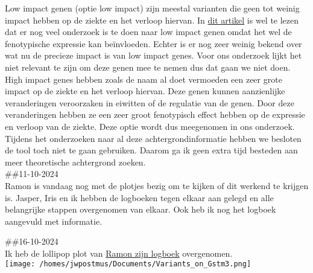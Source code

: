 \documentclass[
]{article}
\begin{document}
Low impact genen (optie low impact) zijn meestal varianten die geen tot
weinig impact hebben op de ziekte en het verloop hiervan. In
\href{https://genomebiology.biomedcentral.com/articles/10.1186/s13059-017-1212-4\#Sec1}{dit
artikel} is wel te lezen dat er nog veel onderzoek is te doen naar low
impact genen omdat het wel de fenotypische expressie kan beïnvloeden.
Echter is er nog zeer weinig bekend over wat nu de precieze impact is
van low impact genes. Voor ons onderzoek lijkt het niet relevant te zijn
om deze genen mee te nemen dus dat gaan we niet doen.\\

High impact genes hebben zoals de naam al doet vermoeden een zeer grote
impact op de ziekte en het verloop hiervan. Deze genen kunnen
aanzienlijke veranderingen veroorzaken in eiwitten of de regulatie van
de genen. Door deze veranderingen hebben ze een zeer groot fenotypisch
effect hebben op de expressie en verloop van de ziekte. Deze optie wordt
dus meegenomen in ons onderzoek.\\

Tijdens het onderzoeken naar al deze achtergrondinformatie hebben we
besloten de tool toch niet te gaan gebruiken. Daarom ga ik geen extra
tijd besteden aan meer theoretische achtergrond zoeken.\\

\#\#11-10-2024\\
Ramon is vandaag nog met de plotjes bezig om te kijken of dit werkend te
krijgen is. Jasper, Iris en ik hebben de logboeken tegen elkaar aan
gelegd en alle belangrijke stappen overgenomen van elkaar. Ook heb ik
nog het logboek aangevuld met informatie.

\#\#16-10-2024\\
Ik heb de lollipop plot van
\href{https://github.com/RamonReilman/GenomicsTranscriptomics/tree/main/logbooks}{Ramon
zijn logboek} overgenomen.\\
\texttt{[image: /homes/jwpostmus/Documents/Variants\_on\_Gstm3.png]}
\end{document}
